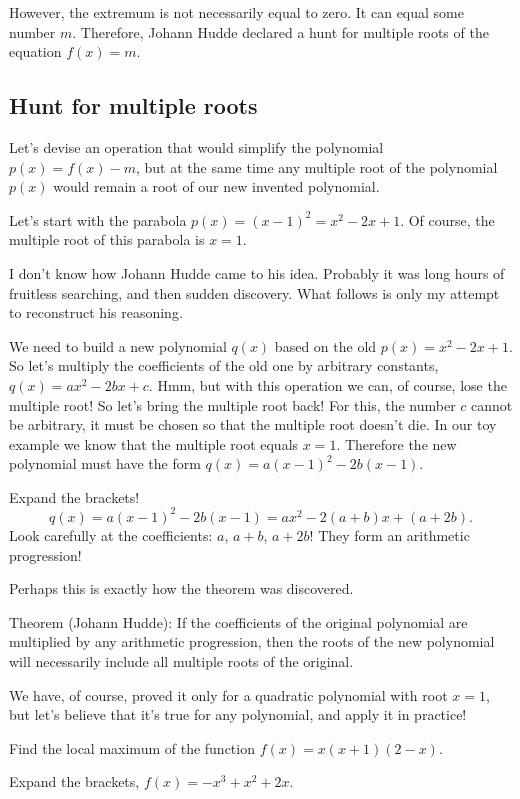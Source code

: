 \documentclass[12pt]{article}
\begin{document}
However, the extremum is not necessarily equal to zero. 
It can equal some number $m$.
Therefore, Johann Hudde declared a hunt for multiple roots of the equation $f(x) = m$.


\subsection*{Hunt for multiple roots}

Let's devise an operation that would simplify the polynomial $p(x) = f(x) - m$, 
but at the same time any multiple root of the polynomial $p(x)$ would remain a root of our new invented polynomial.

Let's start with the parabola $p(x) = (x - 1)^2 = x^2 - 2x + 1$. 
Of course, the multiple root of this parabola is $x = 1$.


I don't know how Johann Hudde came to his idea. 
Probably it was long hours of fruitless searching, and then sudden discovery. 
What follows is only my attempt to reconstruct his reasoning. 

We need to build a new polynomial $q(x)$ based on the old $p(x) = x^2 - 2x + 1$.
So let's multiply the coefficients of the old one by arbitrary constants, $q(x) = ax^2 - 2bx + c$. 
Hmm, but with this operation we can, of course, lose the multiple root! 
So let's bring the multiple root back! 
For this, the number $c$ cannot be arbitrary, it must be chosen so that the multiple root doesn't die. 
In our toy example we know that the multiple root equals $x = 1$.
Therefore the new polynomial must have the form $q(x) = a(x - 1)^2 - 2b (x - 1)$.

Expand the brackets!
\[
    q(x) = a(x - 1)^2 - 2b (x - 1) = ax^2 - 2(a + b) x + (a + 2b).
\]
Look carefully at the coefficients: $a$, $a + b$, $a + 2b$!
They form an arithmetic progression!

Perhaps this is exactly how the theorem was discovered.

Theorem (Johann Hudde):
If the coefficients of the original polynomial are multiplied by any arithmetic progression,
then the roots of the new polynomial will necessarily include all multiple roots of the original.

We have, of course, proved it only for a quadratic polynomial with root $x=1$, but let's believe that it's true for any polynomial, and apply it in practice!

Find the local maximum of the function $f(x) = x (x + 1) (2 - x)$.

Expand the brackets, $f(x) = -x^3 + x^2 + 2x$.
\end{document}
